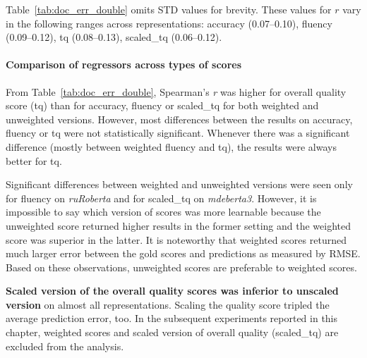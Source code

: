 Table~\ref{tab:doc_err_double} omits STD values for brevity. These values for $r$ vary in the following ranges across representations: accuracy (0.07--0.10), fluency (0.09--0.12), tq (0.08--0.13), scaled\_tq (0.06--0.12).

\paragraph{Comparison of regressors across types of scores}
From Table~\ref{tab:doc_err_double}, Spearman's \textit{r} was higher for overall quality score (tq) than for accuracy, fluency or scaled\_tq for both weighted and unweighted versions. However, most differences between the results on accuracy, fluency or tq were not statistically significant. Whenever there was a significant difference (mostly between weighted fluency and tq), the results were always better for tq.

Significant differences between weighted and unweighted versions were seen only for fluency on \textit{ruRoberta} and for scaled\_tq on \textit{mdeberta3}. However, it is impossible to say which version of scores was more learnable because the unweighted score returned higher results in the former setting and the weighted score was superior in the latter. 
It is noteworthy that weighted scores returned much larger error between the gold scores and predictions as measured by \gls*{RMSE}. 
Based on these observations, {unweighted scores are preferable to weighted scores}.

\textbf{Scaled version of the overall quality scores was inferior to unscaled version} on almost all representations. %
Scaling the quality score tripled the average prediction error, too.
In the subsequent experiments reported in this chapter, weighted scores and scaled version of overall quality (scaled\_tq) are excluded from the analysis.

